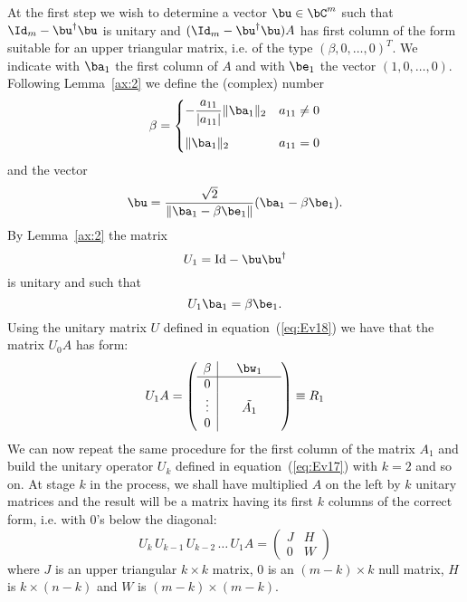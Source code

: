 At the first step we wish to determine a vector $\bu \in \bC^m$ such
that $\Id_m - \bu^{\dagger} \bu$ is unitary and $(\Id_m -
\bu^{\dagger} \bu) A$ has first column of the form suitable for an
upper triangular matrix, i.e. of the type $(\beta, 0, \ldots, 0)^T$.
We indicate with $\ba_1$ the first column of $A$ and with $\be_1$ the
vector $(1,0,\ldots,0)$.  Following Lemma~\ref{ax:2} we define the
(complex) number
%
\begin{equation*}
  \beta =
  \begin{cases}
    -\dfrac{a_{11}}{|a_{11}|} \|\ba_1\|_2 & a_{11} \neq 0 \\*[4mm]
    \| \ba_1 \|_2 & a_{11} = 0
  \end{cases}
\end{equation*}
%
and the vector 
%
\begin{equation*}
  \bu = \frac{\sqrt{2}}{\|\ba_1 - \beta \be_1\|} (\ba_1 - \beta \be_1) .
\end{equation*}
% 
By Lemma~\ref{ax:2} the matrix 
% 
\begin{equation}
  U_1 = \text{Id} - \bu \bu^{\dagger}
  \label{eq:Ev18}
\end{equation}
% 
is unitary and such that 
% 
\begin{equation}
  U_1 \ba_1 = \beta \be_1 .
  \label{eq:Ev19}
\end{equation}
% 
Using the unitary matrix $U$ defined in equation~(\ref{eq:Ev18}) we
have that the matrix $U_0 A$ has form:
%
\begin{equation*}
  U_1 A = 
  \left ( \begin{array}{c|ccc}
      \beta & & \bw_1 & \\ \hline
      0 & & & \\
      \vdots & & \tilde{A_1} & \\
      0 & & & \\ 
    \end{array} \right )  \equiv R_1
\end{equation*}
% 
We can now repeat the same procedure for the first column of the
matrix $A_1$ and build the unitary operator $U_k$ defined in
equation~(\ref{eq:Ev17}) with $k=2$ and so on.  At stage $k$ in the
process, we shall have multiplied $A$ on the left by $k$ unitary
matrices and the result will be a matrix having its first $k$ columns
of the correct form, i.e. with $0$'s below the diagonal:
%
\begin{equation*}
  U_k \, U_{k-1} \, U_{k-2} \, \ldots \, U_1 A = 
  \left ( \begin{array}{c|c} J & H \\ \hline 0 & W \end{array} \right )
\end{equation*}
% 
where $J$ is an upper triangular $k \times k$ matrix, $0$ is an $(m-k)
\times k$ null matrix, $H$ is $k \times (n-k)$ and $W$ is $(m-k)
\times (m-k)$.

